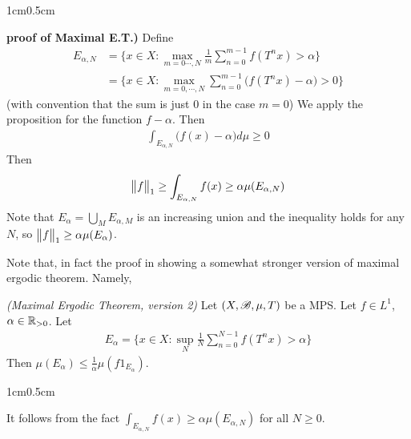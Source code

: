 \documentclass[12pt,a4paper]{report}
\newenvironment{proof}
{\begin{changemargin}{1cm}{0.5cm} 
	}%
	{\end{changemargin}
}
\begin{document}
\begin{proof}
\textbf{proof of Maximal E.T.)} Define
\begin{align*}
E_{\alpha,N} &= \{x\in X : \max_{m=0\cdots, N} \frac{1}{m} \sum_{n=0}^{m-1} f(T^n x) >\alpha   \} \\
&= \{x\in X: \max_{m=0,\cdots,N} \sum_{n=0}^{m-1} \big( f(T^n x) - \alpha \big) > 0 \}
\end{align*}
(with convention that the sum is just 0 in the case $m=0$) We apply the proposition for the function $f-\alpha$. Then
\begin{align*}
\int_{E_{\alpha, N}} \big( f(x) - \alpha \big) d\mu \geq 0
\end{align*}
Then
\begin{align*}
\bigl\lVert f\bigr\rVert_{1} \geq  \int_{E_{\alpha, N}} f(x) \geq \alpha \mu(E_{\alpha,N}) 
\end{align*}
Note that $E_{\alpha} = \bigcup_{M} E_{\alpha,M}$ is an increasing union and the inequality holds for any $N$, so $\bigl\lVert f\bigr\rVert_{1} \geq \alpha\mu(E_{\alpha})$.

\eop
\end{proof}
\s

Note that, in fact the proof in showing a somewhat stronger version of maximal ergodic theorem. Namely,
\s

\thm \emph{(Maximal Ergodic Theorem, version 2)} Let $(X,\mathscr{B}, \mu, T)$ be a MPS. Let $f\in L^1$, $\alpha\in \mathbb{R}_{>0}$. Let
\begin{align*}
E_{\alpha} = \{x\in X : \sup_N \frac{1}{N} \sum_{n=0}^{N-1} f(T^n x) > \alpha \}
\end{align*}
Then $\mu(E_{\alpha}) \leq \frac{1}{\alpha} \mu(f 1_{E_{\alpha}} )$.
\begin{proof}
\pf It follows from the fact $\int_{E_{\alpha, N}} f(x) \geq \alpha \mu(E_{\alpha,N}) $ for all $N\geq 0$.

\eop
\end{proof}
\s
\end{document}
